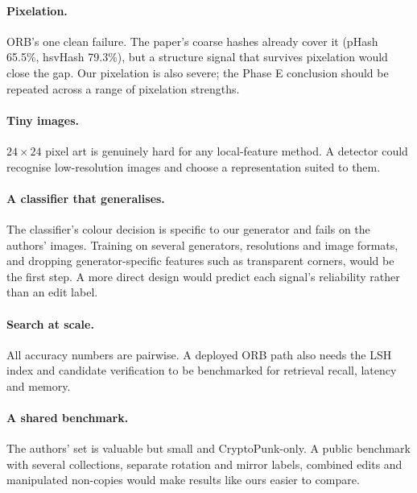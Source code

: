 \paragraph{Pixelation.} ORB's one clean failure. The paper's coarse hashes already cover it
(pHash 65.5\%, hsvHash 79.3\%), but a structure signal that survives pixelation would close
the gap. Our pixelation is also severe; the Phase E conclusion should be repeated across a
range of pixelation strengths.

\paragraph{Tiny images.} $24\times24$ pixel art is genuinely hard for any local-feature method.
A detector could recognise low-resolution images and choose a representation suited to them.

\paragraph{A classifier that generalises.} The classifier's colour decision is specific to our
generator and fails on the authors' images. Training on several generators, resolutions and
image formats, and dropping generator-specific features such as transparent corners, would
be the first step. A more direct design would predict each signal's reliability rather than an
edit label.

\paragraph{Search at scale.} All accuracy numbers are pairwise. A deployed ORB path also needs
the LSH index and candidate verification to be benchmarked for retrieval recall, latency and
memory.

\paragraph{A shared benchmark.} The authors' set is valuable but small and CryptoPunk-only. A
public benchmark with several collections, separate rotation and mirror labels, combined edits
and manipulated non-copies would make results like ours easier to compare.

